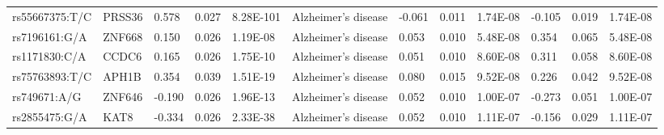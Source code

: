 \begin{table}[]
{\begin{tabular}{llllllllllll}
		\rowcolor[HTML]{E0E0E0}rs55667375:T/C                   & PRSS36                            & 0.578                             & 0.027                           & 8.28E-101                      & Alzheimer’s disease                        & -0.061                            & 0.011                           & 1.74E-08                       & -0.105                          & 0.019                           & 1.74E-08                       \\
		\rowcolor[HTML]{E0E0E0}rs7196161:G/A                    & ZNF668                            & 0.150                             & 0.026                           & 1.19E-08                       & Alzheimer’s disease                        & 0.053                             & 0.010                           & 5.48E-08                       & 0.354                           & 0.065                           & 5.48E-08                       \\
		\rowcolor[HTML]{E0E0E0}rs1171830:C/A                    & CCDC6                             & 0.165                             & 0.026                           & 1.75E-10                       & Alzheimer’s disease                        & 0.051                             & 0.010                           & 8.60E-08                       & 0.311                           & 0.058                           & 8.60E-08                       \\
		\rowcolor[HTML]{E0E0E0}rs75763893:T/C                   & APH1B                             & 0.354                             & 0.039                           & 1.51E-19                       & Alzheimer’s disease                        & 0.080                             & 0.015                           & 9.52E-08                       & 0.226                           & 0.042                           & 9.52E-08                       \\
		\rowcolor[HTML]{E0E0E0}	rs749671:A/G                     & ZNF646                            & -0.190                            & 0.026                           & 1.96E-13                       & Alzheimer’s disease                        & 0.052                             & 0.010                           & 1.00E-07                       & -0.273                          & 0.051                           & 1.00E-07                       \\
		\rowcolor[HTML]{E0E0E0}rs2855475:G/A                    & KAT8                              & -0.334                            & 0.026                           & 2.33E-38                       & Alzheimer’s disease                        & 0.052                             & 0.010                           & 1.11E-07                       & -0.156                          & 0.029                           & 1.11E-07                       \\

\end{tabular}}
\end{table}
